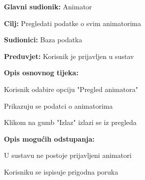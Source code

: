 					\noindent {}
					\begin{packed_item}
					
						\item \textbf{Glavni sudionik: }Animator
						\item  \textbf{Cilj:} Pregledati podatke o svim animatorima
						\item  \textbf{Sudionici:} Baza podatka
						\item  \textbf{Preduvjet:} Korisnik je prijavljen u sustav
						\item  \textbf{Opis osnovnog tijeka:}
					
						\item[] \begin{packed_enum}
							
							\item Korisnik odabire opciju "Pregled animatora"
							\item Prikazuju se podatci o animatorima
							\item Klikom na gumb "Izlaz" izlazi se iz pregleda
					\end{packed_enum}
					
					\item  \textbf{Opis mogućih odstupanja:}
					
					\item[] \begin{packed_item}
						
						\item[2.a] U sustavu ne postoje prijavljeni animatori
						\item[] \begin{packed_enum}
							
							\item Korisniku se ispisuje prigodna poruka
							
						\end{packed_enum}
						
						\end{packed_item}
					\end{packed_item}
			

